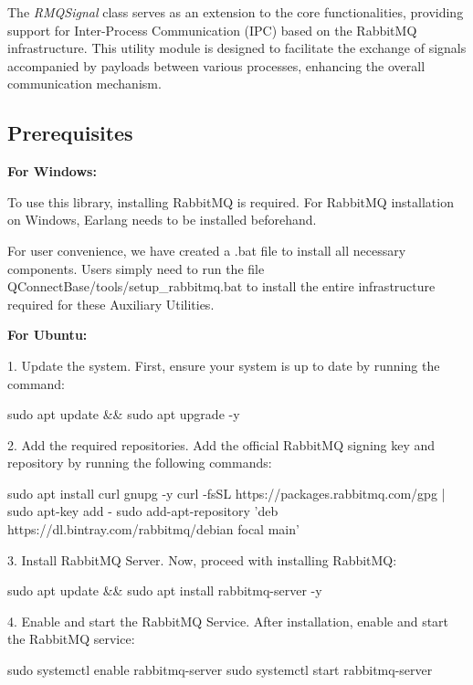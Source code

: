 The \emph{RMQSignal} class serves as an extension to the core functionalities, providing support for Inter-Process Communication (IPC) based on the RabbitMQ infrastructure. This utility module is designed to facilitate the exchange of signals accompanied by payloads between various processes, enhancing the overall communication mechanism.

\subsection{Prerequisites}
\label{subsubsec:prerequisites-details}

\textbf{For Windows:}

To use this library, installing RabbitMQ is required. For RabbitMQ installation on Windows, Earlang needs to be installed beforehand.

For user convenience, we have created a .bat file to install all necessary components. Users simply need to run the file QConnectBase/tools/setup\_rabbitmq.bat to install the entire infrastructure required for these Auxiliary Utilities.

\textbf{For Ubuntu:}

1. Update the system. First, ensure your system is up to date by running the command:

\begin{robotcode}
sudo apt update && sudo apt upgrade -y
\end{robotcode}

2. Add the required repositories. Add the official RabbitMQ signing key and repository by running the following commands:

\begin{robotcode}
sudo apt install curl gnupg -y
curl -fsSL https://packages.rabbitmq.com/gpg | sudo apt-key add -
sudo add-apt-repository 'deb https://dl.bintray.com/rabbitmq/debian focal main'
\end{robotcode}

3. Install RabbitMQ Server. Now, proceed with installing RabbitMQ:

\begin{robotcode}
sudo apt update && sudo apt install rabbitmq-server -y
\end{robotcode}

4. Enable and start the RabbitMQ Service. After installation, enable and start the RabbitMQ service:

\begin{robotcode}
sudo systemctl enable rabbitmq-server
sudo systemctl start rabbitmq-server
\end{robotcode}

